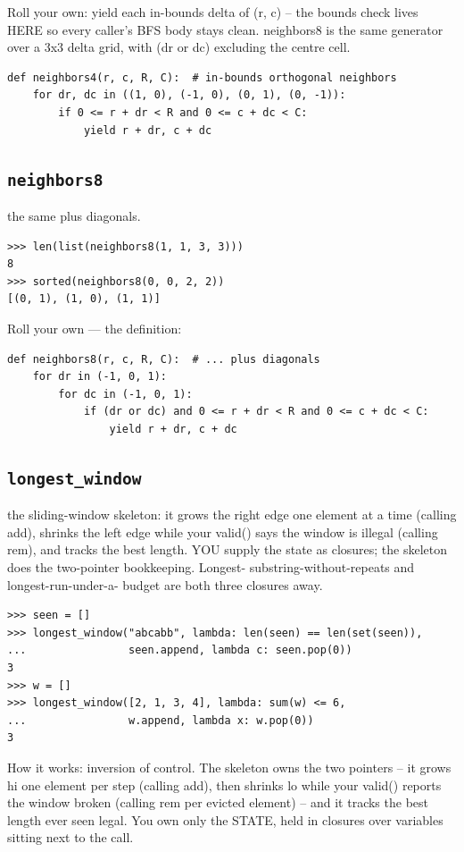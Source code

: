 \documentclass[10pt,letterpaper]{book}
\begin{document}
Roll your own: yield each in-bounds delta of (r, c) -- the bounds check lives HERE so every caller's BFS body stays clean. neighbors8 is the same generator over a 3x3 delta grid, with (dr or dc) excluding the centre cell.

\begin{lstlisting}[style=ex]
def neighbors4(r, c, R, C):  # in-bounds orthogonal neighbors
    for dr, dc in ((1, 0), (-1, 0), (0, 1), (0, -1)):
        if 0 <= r + dr < R and 0 <= c + dc < C:
            yield r + dr, c + dc
\end{lstlisting}
\subsection{\texttt{neighbors8}}\label{def:neighbors8}
the same plus diagonals.
\begin{lstlisting}[style=ex]
>>> len(list(neighbors8(1, 1, 3, 3)))
8
>>> sorted(neighbors8(0, 0, 2, 2))
[(0, 1), (1, 0), (1, 1)]
\end{lstlisting}

Roll your own --- the definition:

\begin{lstlisting}[style=ex]
def neighbors8(r, c, R, C):  # ... plus diagonals
    for dr in (-1, 0, 1):
        for dc in (-1, 0, 1):
            if (dr or dc) and 0 <= r + dr < R and 0 <= c + dc < C:
                yield r + dr, c + dc
\end{lstlisting}
\subsection{\texttt{longest\_window}}\label{def:longest-window}
the sliding-window skeleton: it grows the right edge one element at a time (calling add), shrinks the left edge while your valid() says the window is illegal (calling rem), and tracks the best length. YOU supply the state as closures; the skeleton does the two-pointer bookkeeping. Longest- substring-without-repeats and longest-run-under-a- budget are both three closures away.
\begin{lstlisting}[style=ex]
>>> seen = []
>>> longest_window("abcabb", lambda: len(seen) == len(set(seen)),
...                seen.append, lambda c: seen.pop(0))
3
>>> w = []
>>> longest_window([2, 1, 3, 4], lambda: sum(w) <= 6,
...                w.append, lambda x: w.pop(0))
3
\end{lstlisting}

How it works: inversion of control. The skeleton owns the two pointers -- it grows hi one element per step (calling add), then shrinks lo while your valid() reports the window broken (calling rem per evicted element) -- and it tracks the best length ever seen legal. You own only the STATE, held in closures over variables sitting next to the call.
\end{document}
